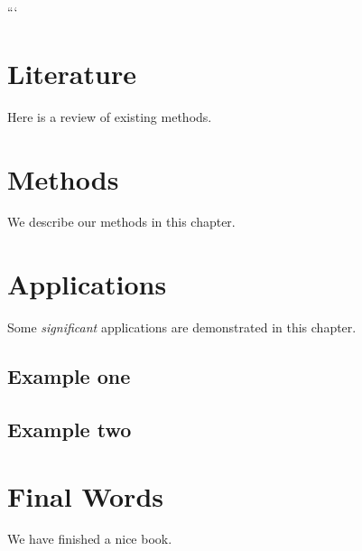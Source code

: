 \documentclass[]{book}
\begin{document}
```

\chapter{Literature}\label{literature}

Here is a review of existing methods.

\chapter{Methods}\label{methods}

We describe our methods in this chapter.

\chapter{Applications}\label{applications}

Some \emph{significant} applications are demonstrated in this chapter.

\section{Example one}\label{example-one}

\section{Example two}\label{example-two}

\chapter{Final Words}\label{final-words}

We have finished a nice book.


\end{document}
